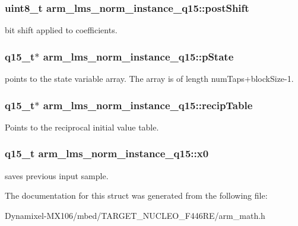 \subsubsection[{\texorpdfstring{post\+Shift}{postShift}}]{\setlength{\rightskip}{0pt plus 5cm}uint8\+\_\+t arm\+\_\+lms\+\_\+norm\+\_\+instance\+\_\+q15\+::post\+Shift}\hypertarget{structarm__lms__norm__instance__q15_aa0d435fbcf7dedb7179d4467e9b79e9f}{}\label{structarm__lms__norm__instance__q15_aa0d435fbcf7dedb7179d4467e9b79e9f}
bit shift applied to coefficients. 
\subsubsection[{\texorpdfstring{p\+State}{pState}}]{\setlength{\rightskip}{0pt plus 5cm}q15\+\_\+t$\ast$ arm\+\_\+lms\+\_\+norm\+\_\+instance\+\_\+q15\+::p\+State}\hypertarget{structarm__lms__norm__instance__q15_aa4de490b3bdbd03561b76ee07901c8e3}{}\label{structarm__lms__norm__instance__q15_aa4de490b3bdbd03561b76ee07901c8e3}
points to the state variable array. The array is of length num\+Taps+block\+Size-\/1. 
\subsubsection[{\texorpdfstring{recip\+Table}{recipTable}}]{\setlength{\rightskip}{0pt plus 5cm}q15\+\_\+t$\ast$ arm\+\_\+lms\+\_\+norm\+\_\+instance\+\_\+q15\+::recip\+Table}\hypertarget{structarm__lms__norm__instance__q15_a9aabb0e4c79f3db807e7a441fa36f5f8}{}\label{structarm__lms__norm__instance__q15_a9aabb0e4c79f3db807e7a441fa36f5f8}
Points to the reciprocal initial value table. 
\subsubsection[{\texorpdfstring{x0}{x0}}]{\setlength{\rightskip}{0pt plus 5cm}q15\+\_\+t arm\+\_\+lms\+\_\+norm\+\_\+instance\+\_\+q15\+::x0}\hypertarget{structarm__lms__norm__instance__q15_a3fc1d6f97d2c6d5324871de6895cb7e9}{}\label{structarm__lms__norm__instance__q15_a3fc1d6f97d2c6d5324871de6895cb7e9}
saves previous input sample. 

The documentation for this struct was generated from the following file\+:\begin{DoxyCompactItemize}
\item 
Dynamixel-\/\+M\+X106/mbed/\+T\+A\+R\+G\+E\+T\+\_\+\+N\+U\+C\+L\+E\+O\+\_\+\+F446\+R\+E/arm\+\_\+math.\+h\end{DoxyCompactItemize}
